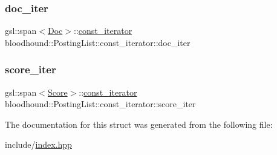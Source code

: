\subsubsection{\texorpdfstring{doc\+\_\+iter}{doc\_iter}}
{\footnotesize\ttfamily gsl\+::span$<$\hyperlink{structbloodhound_1_1Doc}{Doc}$>$\+::\hyperlink{structbloodhound_1_1PostingList_1_1const__iterator}{const\+\_\+iterator} bloodhound\+::\+Posting\+List\+::const\+\_\+iterator\+::doc\+\_\+iter}

\mbox{\label{structbloodhound_1_1PostingList_1_1const__iterator_ade7c448dfba393cc9e34a901461b6b77}} 
\subsubsection{\texorpdfstring{score\+\_\+iter}{score\_iter}}
{\footnotesize\ttfamily gsl\+::span$<$\hyperlink{structbloodhound_1_1Score}{Score}$>$\+::\hyperlink{structbloodhound_1_1PostingList_1_1const__iterator}{const\+\_\+iterator} bloodhound\+::\+Posting\+List\+::const\+\_\+iterator\+::score\+\_\+iter}



The documentation for this struct was generated from the following file\+:\begin{DoxyCompactItemize}
\item 
include/\hyperlink{index_8hpp}{index.\+hpp}\end{DoxyCompactItemize}
